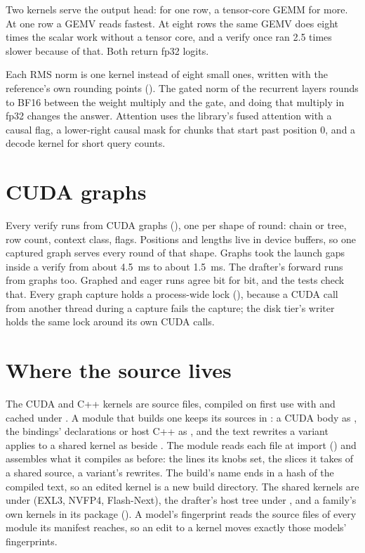 Two kernels serve the output head:  for one row, a tensor-core GEMM for more. At one row a GEMV reads fastest. At eight rows the same GEMV does eight times the scalar work without a tensor core, and a verify once ran 2.5 times slower because of that. Both return fp32 logits.

Each RMS norm is one kernel instead of eight small ones, written with the reference's own rounding points (). The gated norm of the recurrent layers rounds to BF16 between the weight multiply and the gate, and doing that multiply in fp32 changes the answer. Attention uses the library's fused attention with a causal flag, a lower-right causal mask for chunks that start past position 0, and a decode kernel for short query counts.

\section{CUDA graphs}

Every verify runs from CUDA graphs (), one per shape of round: chain or tree, row count, context class, flags. Positions and lengths live in device buffers, so one captured graph serves every round of that shape. Graphs took the launch gaps inside a verify from about 4.5~ms to about 1.5~ms. The drafter's forward runs from graphs too. Graphed and eager runs agree bit for bit, and the tests check that. Every graph capture holds a process-wide lock (), because a CUDA call from another thread during a capture fails the capture; the disk tier's writer holds the same lock around its own CUDA calls.

\section{Where the source lives}

The CUDA and C++ kernels are source files, compiled on first use with  and cached under . A module  that builds one keeps its sources in : a CUDA body as , the bindings' declarations or host C++ as , and the text rewrites a variant applies to a shared kernel as  beside . The module reads each file at import () and assembles what it compiles as before: the  lines its knobs set, the slices it takes of a shared source, a variant's rewrites. The build's name ends in a hash of the compiled text, so an edited kernel is a new build directory. The shared kernels are under  (EXL3, NVFP4, Flash-Next), the drafter's host tree under , and a family's own kernels in its package (). A model's fingerprint reads the source files of every module its manifest reaches, so an edit to a kernel moves exactly those models' fingerprints.

